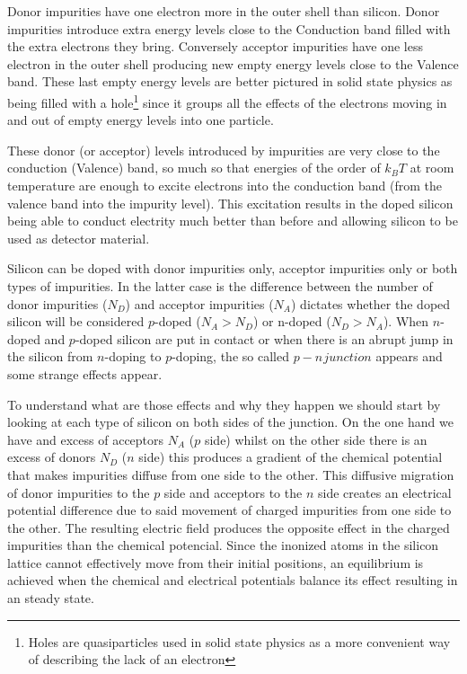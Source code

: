 Donor impurities have one electron more in the outer shell than silicon. Donor impurities introduce extra energy levels close to the Conduction band filled with the extra electrons they bring. Conversely acceptor impurities have one less electron in the outer shell producing new empty energy levels close to the Valence band. These last empty energy levels are better pictured in solid state physics as being filled with a hole\footnote{Holes are quasiparticles used in solid state physics as a more convenient way of describing the lack of an electron} since it groups all the effects of the electrons moving in and out of empty energy levels into one particle.

These donor (or acceptor) levels introduced by impurities are very close to the conduction (Valence) band, so much so that energies of the order of $k_B T$ at room temperature are enough to excite electrons into the conduction band (from the valence band into the impurity level). This excitation results in the doped silicon being able to conduct electrity much better than before and allowing silicon to be used as detector material.

Silicon can be doped with donor impurities only, acceptor impurities only or both types of impurities. In the latter case is the difference between the number of donor impurities ($N_D$) and acceptor impurities ($N_A$) dictates whether the doped silicon will be considered $p$-doped ($N_A > N_D $) or n-doped ($N_D > N_A$). When $n$-doped and $p$-doped silicon are put in contact or when there is an abrupt jump in the silicon from $n$-doping to $p$-doping, the so called $p-n \hspace{1pt} junction$ appears and some strange effects appear.

To understand what are those effects and why they happen we should start by looking at each type of silicon on both sides of the junction. On the one hand we have and excess of acceptors $N_A$ ($p$ side) whilst on the other side there is an excess of donors $N_D$ ($n$ side) this produces a gradient of the chemical potential that makes impurities diffuse from one side to the other. This diffusive migration of donor impurities to the $p$ side and acceptors to the $n$ side creates an electrical potential difference due to said movement of charged impurities from one side to the other. The resulting electric field produces the opposite effect in the charged impurities than the chemical potencial. Since the inonized atoms in the silicon lattice cannot effectively move from their initial positions, an equilibrium is achieved when the chemical and electrical potentials balance its effect resulting in an steady state. 

